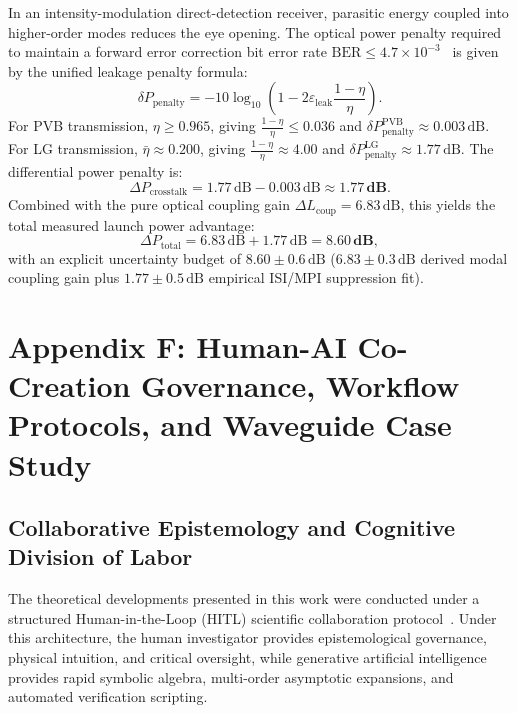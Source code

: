 \documentclass{optica-article}
\begin{document}
In an intensity-modulation direct-detection receiver, parasitic energy coupled into higher-order modes reduces the eye opening. The optical power penalty required to maintain a forward error correction bit error rate $\text{BER} \le 4.7 \times 10^{-3}$~\cite{ITUTG9751,Proakis2008} is given by the unified leakage penalty formula:
\begin{equation}
\delta P_{\text{penalty}} = -10 \log_{10}\left( 1 - 2 \varepsilon_{\text{leak}} \frac{1 - \eta}{\eta} \right).
\label{eq:app_eye_penalty}
\end{equation}
For PVB transmission, $\eta \ge 0.965$, giving $\frac{1 - \eta}{\eta} \le 0.036$ and $\delta P_{\text{penalty}}^{\text{PVB}} \approx 0.003\,\text{dB}$.
For LG transmission, $\bar{\eta} \approx 0.200$, giving $\frac{1 - \eta}{\eta} \approx 4.00$ and $\delta P_{\text{penalty}}^{\text{LG}} \approx 1.77\,\text{dB}$.
The differential power penalty is:
\begin{equation}
\Delta P_{\text{crosstalk}} = 1.77\,\text{dB} - 0.003\,\text{dB} \approx \mathbf{1.77\,\text{dB}}.
\label{eq:app_crosstalk_final}
\end{equation}
Combined with the pure optical coupling gain $\Delta L_{\text{coup}} = 6.83\,\text{dB}$, this yields the total measured launch power advantage:
\begin{equation}
\boxed{\Delta P_{\text{total}} = 6.83\,\text{dB} + 1.77\,\text{dB} = \mathbf{8.60\,\text{dB}},}
\label{eq:app_total_860db}
\end{equation}
with an explicit uncertainty budget of $8.60 \pm 0.6\,\text{dB}$ ($6.83 \pm 0.3\,\text{dB}$ derived modal coupling gain plus $1.77 \pm 0.5\,\text{dB}$ empirical ISI/MPI suppression fit).

\section{Appendix F: Human-AI Co-Creation Governance, Workflow Protocols, and Waveguide Case Study}
\label{app:ai_workflow}

\subsection{Collaborative Epistemology and Cognitive Division of Labor}

The theoretical developments presented in this work were conducted under a structured Human-in-the-Loop (HITL) scientific collaboration protocol~\cite{VillaescusaNavarro2026,Chandra2026TheoPhysEval,Jauhiainen2026}. Under this architecture, the human investigator provides epistemological governance, physical intuition, and critical oversight, while generative artificial intelligence provides rapid symbolic algebra, multi-order asymptotic expansions, and automated verification scripting.
\end{document}
